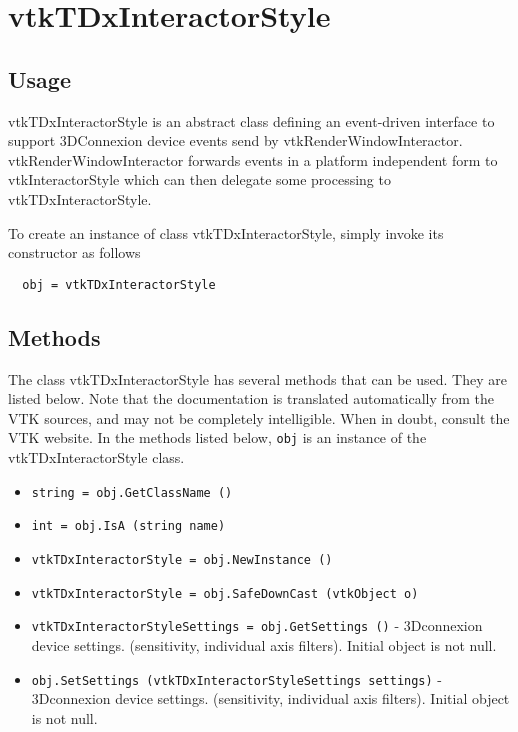 \section{vtkTDxInteractorStyle}

\subsection{Usage}

 vtkTDxInteractorStyle is an abstract class defining an event-driven
 interface to support 3DConnexion device events send by
 vtkRenderWindowInteractor.
 vtkRenderWindowInteractor forwards events in a platform independent form to
 vtkInteractorStyle which can then delegate some processing to
 vtkTDxInteractorStyle.

To create an instance of class vtkTDxInteractorStyle, simply
invoke its constructor as follows
\begin{verbatim}
  obj = vtkTDxInteractorStyle
\end{verbatim}
\subsection{Methods}

The class vtkTDxInteractorStyle has several methods that can be used.
  They are listed below.
Note that the documentation is translated automatically from the VTK sources,
and may not be completely intelligible.  When in doubt, consult the VTK website.
In the methods listed below, \verb|obj| is an instance of the vtkTDxInteractorStyle class.
\begin{itemize}
\item  \verb|string = obj.GetClassName ()|

\item  \verb|int = obj.IsA (string name)|

\item  \verb|vtkTDxInteractorStyle = obj.NewInstance ()|

\item  \verb|vtkTDxInteractorStyle = obj.SafeDownCast (vtkObject o)|

\item  \verb|vtkTDxInteractorStyleSettings = obj.GetSettings ()| -  3Dconnexion device settings. (sensitivity, individual axis filters).
 Initial object is not null.

\item  \verb|obj.SetSettings (vtkTDxInteractorStyleSettings settings)| -  3Dconnexion device settings. (sensitivity, individual axis filters).
 Initial object is not null.

\end{itemize}
